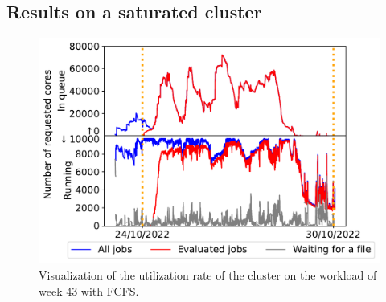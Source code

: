 \documentclass[sigconf,review,anonymous]{acmart}
\begin{document}
\subsection{Results on a saturated cluster}\label{sec.43}

\begin{figure}[t]\centering\includegraphics[width=0.9\linewidth]{../MBSS/plot/Cluster_usage/2022-10-24->2022-10-30_V10000_anonymous_Fcfs_Used_nodes_450_128_32_256_4_1024_core_by_core.pdf}\caption{Visualization of the utilization rate of the cluster on the workload of week 43 with FCFS.}\label{cluster_usage.43}\end{figure}
\end{document}
